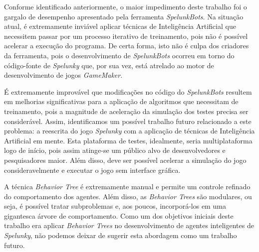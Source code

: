 Conforme identificado anteriormente, o maior impedimento deste trabalho foi o
gargalo de desempenho apresentado pela ferramenta \textit{SpelunkBots}. Na
situação atual, é extremamente inviável aplicar técnicas de Inteligência
Artificial que necessitem passar por um processo iterativo de treinamento, pois
não é possível acelerar a execução do programa. De certa forma, isto não é culpa
dos criadores da ferramenta, pois o desenvolvimento de \textit{SpelunkBots}
ocorreu em torno do código-fonte de \textit{Spelunky} que, por sua vez, está
atrelado ao motor de desenvolvimento de jogos \textit{GameMaker}. 

É extremamente improvável que modificações no código do \textit{SpelunkBots}
resultem em melhorias significativas para a aplicação de algoritmos que
necessitam de treinamento, pois a magnitude de aceleração da simulação dos
testes precisa ser considerável. Assim, identificamos um possível trabalho
futuro relacionado a este problema: a reescrita do jogo \textit{Spelunky} com a
aplicação de técnicas de Inteligência Artificial em mente. Esta plataforma de
testes, idealmente, seria multiplataforma logo de início, pois assim atinge-se
um público alvo de desenvolvedores e pesquisadores maior. Além disso, deve ser
possível acelerar a simulação do jogo consideravelmente e executar o jogo sem
interface gráfica.

A técnica \textit{Behavior Tree} é extremamente manual e permite um controle
refinado do comportamento dos agentes. Além disso, as \textit{Behavior Trees}
são modulares, ou seja, é possível tratar subproblemas e, aos poucos,
incorporá-los em uma gigantesca árvore de comportamento. Como um dos objetivos
iniciais deste trabalho era aplicar \textit{Behavior Trees} no desenvolvimento
de agentes inteligentes de \textit{Spelunky}, não podemos deixar de sugerir esta
abordagem como um trabalho futuro.
